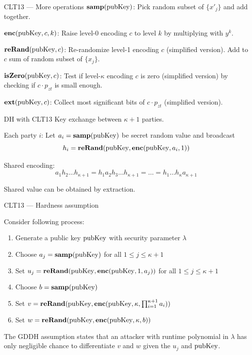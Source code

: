 \documentclass[english]{beamer}
\begin{document}
    \begin{frame}{CLT13 --- More operations}
        $\mathbf{samp}(\mathrm{pubKey})$: Pick random subset of $\{x'_j\}$ and add together.

        $\mathbf{enc}(\mathrm{pubKey}, c, k)$: Raise level-0 encoding $c$ to level $k$ by multiplying with $y^k$.

        $\mathbf{reRand}(\mathrm{pubKey}, c)$: Re-randomize level-1 encoding $c$ (simplified version). Add to $c$ sum of random subset of $\{x_j\}$.

        $\mathbf{isZero}(\mathrm{pubKey}, c)$: Test if level-$\kappa$ encoding $c$ is zero (simplified version) by checking if $c \cdot p_{zt}$ is small enough.

        $\mathbf{ext}(\mathrm{pubKey}, c)$: Collect most significant bits of $c \cdot p_{zt}$ (simplified version).
    \end{frame}
    \begin{frame}{DH with CLT13}
        Key exchange between $\kappa + 1$ parties.

        Each party $i$: Let $a_i = \mathbf{samp}(\mathrm{pubKey})$ be secret random value and broadcast
        \begin{equation*}
            h_i = \mathbf{reRand}(\mathrm{pubKey}, \mathbf{enc}(\mathrm{pubKey}, a_i, 1))
        \end{equation*}

        Shared encoding:
        \begin{equation*}
            a_1 h_2 \dots h_{\kappa+1} = h_1 a_2 h_3 \dots h_{\kappa+1} = \dots = h_1 \dots h_{\kappa} a_{\kappa + 1}
        \end{equation*}

        Shared value can be obtained by extraction.
    \end{frame}
    \begin{frame}{CLT13 --- Hardness assumption}
        \begin{definition}
            Consider following process:
            \begin{enumerate}
                \item Generate a public key $\mathrm{pubKey}$ with security parameter $\lambda$
                \item Choose $a_j = \mathbf{samp}(\mathrm{pubKey})$ for all $1 \leq j \leq \kappa + 1$
                \item Set $u_j = \mathbf{reRand}(\mathrm{pubKey}, \mathbf{enc}(\mathrm{pubKey}, 1, a_j))$ for all $1 \leq j \leq \kappa + 1$
                \item Choose $b = \mathbf{samp}(\mathrm{pubKey})$
                \item Set $v = \mathbf{reRand}(\mathrm{pubKey}, \mathbf{enc}(\mathrm{pubKey}, \kappa, \prod_{i=1}^{\kappa + 1} a_i))$
                \item Set $w = \mathbf{reRand}(\mathrm{pubKey}, \mathbf{enc}(\mathrm{pubKey}, \kappa, b))$
            \end{enumerate}

            The GDDH assumption states that an attacker with runtime polynomial in $\lambda$ has only negligible chance to differentiate $v$ and $w$ given the $u_j$ and $\mathrm{pubKey}$.
        \end{definition}
    \end{frame}
\end{document}
